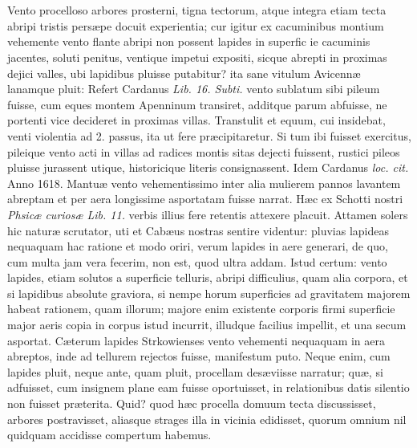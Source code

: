 \documentclass[a4paper, 11pt, oneside, polutonikogreek, latin]{article}
\begin{document}
\section[Lapides non sunt in aera abrepti procella.]{}
\paragraph{}
Vento procelloso arbores prosterni, tigna tectorum, atque integra etiam tecta abripi tristis persæpe docuit experientia; cur igitur ex cacuminibus montium vehemente vento flante abripi non possent lapides in superfic ie cacuminis jacentes, soluti penitus, ventique impetui expositi, sicque abrepti in proximas dejici valles, ubi lapidibus pluisse putabitur? ita sane vitulum Avicennæ lanamque pluit: Refert Cardanus \emph{Lib. 16. Subti.} vento sublatum sibi pileum fuisse, cum eques montem Apenninum transiret, additque parum abfuisse, ne portenti vice decideret in proximas villas. Transtulit et equum, cui insidebat, venti violentia ad 2. passus, ita ut fere præcipitaretur. Si tum ibi fuisset exercitus, pileique vento acti in villas ad radices montis sitas dejecti fuissent, rustici pileos pluisse jurassent utique, historicique literis consignassent. Idem Cardanus \emph{loc. cit.} Anno 1618. Mantuæ vento vehementissimo inter alia mulierem pannos lavantem abreptam et per aera longissime asportatam fuisse narrat. Hæc ex Schotti nostri \emph{Phsicæ curiosæ Lib. 11.} verbis illius fere retentis attexere placuit. Attamen solers hic naturæ scrutator, uti et Cabæus nostras sentire videntur: pluvias lapideas nequaquam hac ratione et modo oriri, verum lapides in aere generari, de quo, cum multa jam vera fecerim, non est, quod ultra addam. Istud certum: vento lapides, etiam solutos a superficie telluris, abripi difficulius, quam alia corpora, et si lapidibus absolute graviora, si nempe horum superficies ad gravitatem majorem habeat rationem, quam illorum; majore enim existente corporis firmi superficie major aeris copia in corpus istud incurrit, illudque facilius impellit, et una secum asportat. Cæterum lapides Strkowienses vento vehementi nequaquam in aera abreptos, inde ad tellurem rejectos fuisse, manifestum puto. Neque enim, cum lapides pluit, neque ante, quam pluit, procellam desæviisse narratur; quæ, si adfuisset, cum insignem plane eam fuisse oportuisset, in relationibus datis silentio non fuisset præterita. Quid? quod hæc procella domuum tecta discussisset, arbores postravisset, aliasque strages illa in vicinia edidisset, quorum omnium nil quidquam accidisse compertum habemus.
\clearpage
\end{document}

